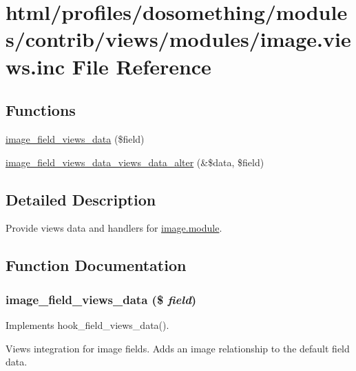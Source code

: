 \hypertarget{image_8views_8inc}{
\section{html/profiles/dosomething/modules/contrib/views/modules/image.views.inc File Reference}
\label{image_8views_8inc}
}
\subsection*{Functions}
\begin{DoxyCompactItemize}
\item 
\hyperlink{image_8views_8inc_a16056953cf5eff02d472cd7dd3d802e1}{image\_\-field\_\-views\_\-data} (\$field)
\item 
\hyperlink{image_8views_8inc_a6a573e59d074618f557734255bd235b8}{image\_\-field\_\-views\_\-data\_\-views\_\-data\_\-alter} (\&\$data, \$field)
\end{DoxyCompactItemize}


\subsection{Detailed Description}
Provide views data and handlers for \hyperlink{image_8module}{image.module}. 

\subsection{Function Documentation}
\hypertarget{image_8views_8inc_a16056953cf5eff02d472cd7dd3d802e1}{
\subsubsection[{image\_\-field\_\-views\_\-data}]{\setlength{\rightskip}{0pt plus 5cm}image\_\-field\_\-views\_\-data (\$ {\em field})}}
\label{image_8views_8inc_a16056953cf5eff02d472cd7dd3d802e1}
Implements hook\_\-field\_\-views\_\-data().

Views integration for image fields. Adds an image relationship to the default field data.

